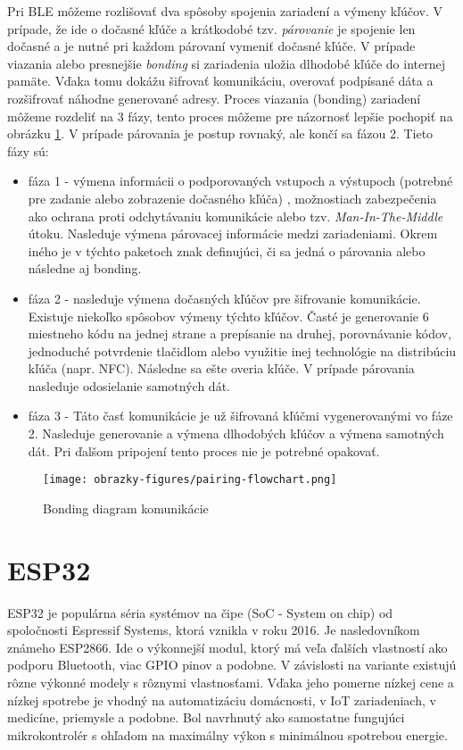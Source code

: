 Pri BLE môžeme rozlišovať dva spôsoby spojenia zariadení a výmeny kľúčov. V prípade, že ide o dočasné kľúče a krátkodobé tzv. \textit{párovanie} je spojenie len dočasné a je nutné pri každom párovaní vymeniť dočasné kľúče. V prípade viazania alebo presnejšie \textit{bonding} si zariadenia uložia dlhodobé kľúče do internej pamäte. Vďaka tomu dokážu šifrovať komunikáciu, overovať podpísané dáta a rozšifrovať náhodne generované adresy.
Proces viazania (bonding) zariadení môžeme rozdeliť na 3 fázy, tento proces môžeme pre názornosť lepšie pochopiť na obrázku \ref{fig:bonding}. V prípade párovania je postup rovnaký, ale končí sa fázou 2. Tieto fázy sú:
\begin{itemize}
    \item fáza 1 - výmena informácii o podporovaných vstupoch a výstupoch (potrebné pre zadanie alebo zobrazenie dočasného kľúča) , možnostiach zabezpečenia ako ochrana proti odchytávaniu komunikácie alebo tzv. \textit{Man-In-The-Middle} útoku. Nasleduje výmena párovacej informácie medzi zariadeniami. Okrem iného je v týchto paketoch znak definujúci, či sa jedná o párovania alebo následne aj bonding.
    \item fáza 2 - nasleduje výmena dočasných kľúčov pre šifrovanie komunikácie. Existuje niekoľko spôsobov výmeny týchto kľúčov. Časté je generovanie 6 miestneho kódu na jednej strane a prepísanie na druhej, porovnávanie kódov, jednoduché potvrdenie tlačidlom alebo využitie inej technológie na distribúciu kľúča (napr. NFC). Následne sa ešte overia kľúče. V prípade párovania nasleduje odosielanie samotných dát.
    \item fáza 3 - Táto časť komunikácie je už šifrovaná kľúčmi vygenerovanými vo fáze 2. Nasleduje generovanie a výmena dlhodobých kľúčov a výmena samotných dát. Pri ďalšom pripojení tento proces nie je potrebné opakovať.\cite{bluetooth}
\end{itemize}

\begin{figure}[ht]
    \centering
    \texttt{[image: obrazky-figures/pairing-flowchart.png]}
    \caption{Bonding diagram komunikácie\cite{bluetooth}}
    \label{fig:bonding}
\end{figure}



\chapter{ESP32}

ESP32 je populárna séria systémov na čipe (SoC - System on chip) od spoločnosti Espressif Systems, ktorá vznikla v roku 2016. Je nasledovníkom známeho ESP2866. Ide o výkonnejší modul, ktorý má veľa ďalších vlastností ako podporu Bluetooth, viac GPIO pinov a podobne. V závislosti na variante existujú rôzne výkonné modely s rôznymi vlastnosťami.
Vďaka jeho pomerne nízkej cene a nízkej spotrebe je vhodný na automatizáciu domácnosti, v IoT zariadeniach, v medicíne, priemysle a podobne. Bol navrhnutý ako samostatne fungujúci mikrokontrolér s ohľadom na maximálny výkon s minimálnou spotrebou energie.

